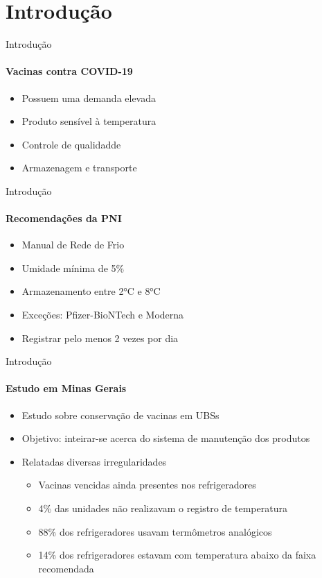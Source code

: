 \section{Introdução}
\begin{frame}{Introdução}
  \framesubtitle{Vacinas contra COVID-19}
  
  \begin{itemize}
    \item Possuem uma demanda elevada
    \item Produto sensível à temperatura
    \item Controle de qualidadde
    \item Armazenagem e transporte
  \end{itemize}
\end{frame}

\begin{frame}{Introdução}
  \framesubtitle{Recomendações da PNI}
  
  \begin{itemize}
    \item Manual de Rede de Frio
    \item Umidade mínima de \alert{5\%}
    \item Armazenamento entre \alert{2°C} e \alert{8°C}
    \item Exceções: Pfizer-BioNTech e Moderna
    \item Registrar pelo menos 2 vezes por dia
  \end{itemize}
\end{frame}

\begin{frame}{Introdução}
  \framesubtitle{Estudo em Minas Gerais}
  
  \begin{itemize}
    \item Estudo sobre conservação de vacinas em UBSs
    \item Objetivo: inteirar-se acerca do sistema de manutenção dos produtos
    \item Relatadas diversas irregularidades
    \begin{itemize}
      \item Vacinas vencidas ainda presentes nos refrigeradores
      \item \alert{4\%} das unidades não realizavam o registro de temperatura
      \item \alert{88\%} dos refrigeradores usavam termômetros analógicos
      \item \alert{14\%} dos refrigeradores estavam com temperatura abaixo da faixa recomendada
    \end{itemize}
  \end{itemize}
\end{frame}
